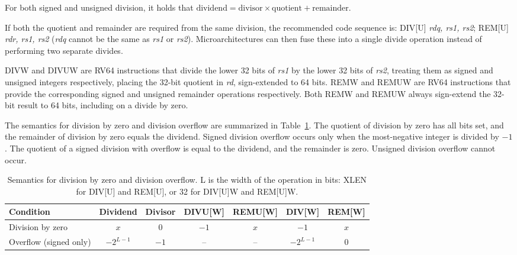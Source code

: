\begin{commentary}
For both signed and unsigned division, it holds that
\mbox{$\textrm{dividend} = \textrm{divisor} \times \textrm{quotient} + \textrm{remainder}$}.
\end{commentary}

If both the quotient and remainder
are required from the same division, the recommended code sequence is:
DIV[U] {\em rdq, rs1, rs2}; REM[U] {\em rdr, rs1, rs2} ({\em rdq}
cannot be the same as {\em rs1} or {\em rs2}).  Microarchitectures can
then fuse these into a single divide operation instead of performing
two separate divides.

DIVW and DIVUW are RV64 instructions that divide the
lower 32 bits of {\em rs1} by the lower 32 bits of {\em rs2}, treating
them as signed and unsigned integers respectively, placing the 32-bit
quotient in {\em rd}, sign-extended to 64 bits.  REMW and REMUW
are RV64 instructions that provide the corresponding
signed and unsigned remainder operations respectively. Both REMW and
REMUW always sign-extend the 32-bit result to 64 bits, including on a
divide by zero.

The semantics for division by zero and division overflow are summarized in
Table~\ref{tab:divby0}.  The quotient of division by zero has all bits set, and
the remainder of division by zero equals the dividend.  Signed division overflow
occurs only when the most-negative integer is divided by $-1$.  The quotient of
a signed division with overflow is equal to the dividend, and the remainder is
zero. Unsigned division overflow cannot occur.

\begin{table}[h]
\center
\begin{tabular}{|l|c|c||c|c|c|c|}
\hline
Condition              & Dividend   & Divisor & DIVU[W]   & REMU[W] & DIV[W]     & REM[W] \\ \hline
Division by zero       & $x$        & 0       & $-1$      & $x$     & $-1$       & $x$    \\
Overflow (signed only) & $-2^{L-1}$ & $-1$    & --        & --      & $-2^{L-1}$ & 0      \\
\hline
\end{tabular}
\caption{Semantics for division by zero and division overflow.
L is the width of the operation in bits: XLEN for DIV[U] and REM[U], or
32 for DIV[U]W and REM[U]W.}
\label{tab:divby0}
\end{table}

